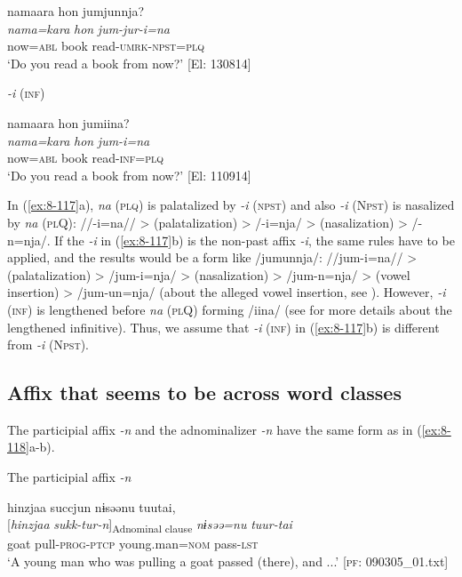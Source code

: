 {\TM}
\glll  namaara  hon  jumjunnja?\\
\textit{nama=kara}  \textit{hon}  \textit{jum-jur-i=na}\\
now=\textsc{abl}  book  read-\textsc{umrk}-\textsc{npst}=\textsc{plq}\\
\glt ‘Do you read a book from now?’ [El: 130814]


\ex \textit{-i} (\textsc{inf})

{\TM}
\glll  namaara  hon  jumiina?\\
\textit{nama=kara}  \textit{hon}  \textit{jum-i=na}\\
now=\textsc{abl}  book  read-\textsc{inf}=\textsc{plq}\\
\glt ‘Do you read a book from now?’ [El: 110914]
\z
\z

In (\ref{ex:8-117}a), \textit{na} (\textsc{plq}) is palatalized by \textit{-i} (\textsc{npst}) and also \textit{-i} (N\textsc{pst}) is nasalized by \textit{na} (\textsc{pl}Q): //-i=na// > (palatalization) > /-i=nja/ > (nasalization) > /-n=nja/. If the \textit{-i} in (\ref{ex:8-117}b) is the non-past affix \textit{-i}, the same rules have to be applied, and the results would be a form like /jumunnja/: //jum-i=na// > (palatalization) > /jum-i=nja/ > (nasalization) > /jum-n=nja/ > (vowel insertion) > /jum-un=nja/ (about the alleged vowel insertion, see ). However, \textit{-i} (\textsc{inf}) is lengthened before \textit{na} (\textsc{pl}Q) forming /iina/ (see  for more details about the lengthened infinitive). Thus, we assume that \textit{-i} (\textsc{inf}) in (\ref{ex:8-117}b) is different from \textit{-i} (N\textsc{pst}).

\subsection{Affix that seems to be across word classes}

The participial affix \textit{-n} and the adnominalizer \textit{-n} have the same form as in (\ref{ex:8-118}a-b).

\ea\label{ex:8-118}
\ea The participial affix \textit{-n}

  {\TM}
\glll   hinzjaa  succjun  nɨsəənu  tuutai,\\
    {}[\textit{hinzjaa}  \textit{sukk-tur-n}]\textsubscript{Adnominal clause}  \textit{nɨsəə=nu}  \textit{tuur-tai}\\
    goat  pull-\textsc{prog}-\textsc{ptcp}  young.man=\textsc{nom}  pass-\textsc{lst}\\
\glt ‘A young man who was pulling a goat passed (there), and ...’  [\textsc{pf}: 090305\_01.txt]

